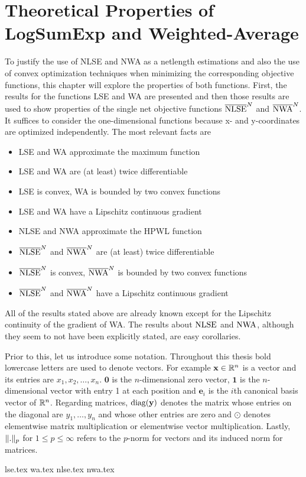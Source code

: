 \chapter{Theoretical Properties of LogSumExp and Weighted-Average} \label{chap:theoretical_properties}

To justify the use of NLSE and NWA as a netlength estimations 
and also the use of convex optimization techniques when minimizing the corresponding objective functions,
this chapter will explore the properties of both functions.
First, the results for the functions LSE and WA are presented 
and then those results are used to show properties of the single net objective functions \(\overline{\operatorname{NLSE}}^N\) and \(\overline{\operatorname{NWA}}^N\).
It suffices to consider the one-dimensional functions because x- and y-coordinates are optimized independently.
The most relevant facts are
\begin{itemize}
 \item LSE and WA approximate the maximum function
 \item LSE and WA are (at least) twice differentiable
 \item LSE is convex, WA is bounded by two convex functions
 \item LSE and WA have a Lipschitz continuous gradient
 \item NLSE and NWA approximate the HPWL function
 \item \(\overline{\operatorname{NLSE}}^N\) and \(\overline{\operatorname{NWA}}^N\) are (at least) twice differentiable
 \item \(\overline{\operatorname{NLSE}}^N\) is convex, \(\overline{\operatorname{NWA}}^N\) is bounded by two convex functions
 \item \(\overline{\operatorname{NLSE}}^N\) and \(\overline{\operatorname{NWA}}^N\) have a Lipschitz continuous gradient
\end{itemize}
All of the results stated above are already known except for the Lipschitz continuity of the gradient of WA.
The results about \(\operatorname{NLSE}\) and \(\operatorname{NWA}\), although they seem to not have been explicitly stated, are easy corollaries.

Prior to this, let us introduce some notation.
Throughout this thesis bold lowercase letters are used to denote vectors.
For example \(\mathbf{x} \in \mathbb{R}^n\) is a vector and its entries are \(x_1, x_2, \ldots, x_n\).
\(\mathbf{0}\) is the \(n\)-dimensional zero vector,
\(\mathbf{1}\) is the \(n\)-dimensional vector with entry 1 at each position
and \(\mathbf{e}_i\) is the \(i\)th canonical basis vector of \(\mathbb{R}^n\).
Regarding matrices, \(\operatorname{diag}(\mathbf{y})\) denotes the matrix whose entries on the diagonal are \(y_1, \ldots, y_n\)
and whose other entries are zero
and \(\odot\) denotes elementwise matrix multiplication or elementwise vector multiplication.
Lastly, \(\lVert.\rVert_p\) for \(1 \leq p \leq \infty\) refers to the \(p\)-norm for vectors and its induced norm for matrices.

{lse.tex}
{wa.tex}
{nlse.tex}
{nwa.tex}
